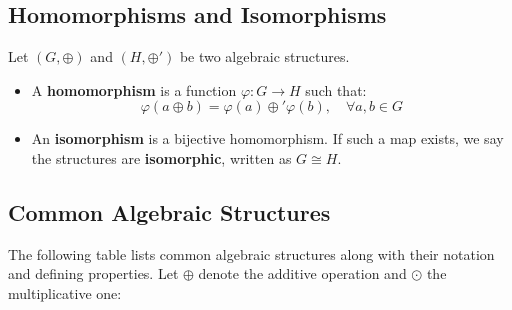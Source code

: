 \subsection{Homomorphisms and Isomorphisms}

Let \((G, \oplus)\) and \((H, \oplus')\) be two algebraic structures.

\begin{itemize}[label=\(-\)]
    \item A \textbf{homomorphism} is a function \(\varphi: G \rightarrow H\) such that:
    \[
    \varphi(a \oplus b) = \varphi(a) \oplus' \varphi(b), \quad \forall a,b \in G
    \]
    
    \item An \textbf{isomorphism} is a bijective homomorphism. If such a map exists, we say the structures are \textbf{isomorphic}, written as \(G \cong H\).
\end{itemize}

\subsection{Common Algebraic Structures}

The following table lists common algebraic structures along with their notation and defining properties. Let \(\oplus\) denote the additive operation and \(\odot\) the multiplicative one:

